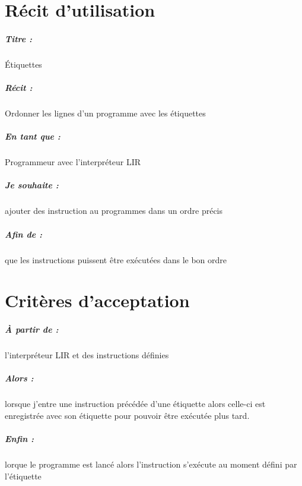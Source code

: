 \documentclass[12pt,a5paper, notitle, oneside]{report}
\begin{document}
    \chapter*{Récit d'utilisation}

    \paragraph{Titre : } Étiquettes
    \paragraph{Récit : } Ordonner les lignes d'un programme avec les étiquettes
    \paragraph{En tant que : } Programmeur avec l'interpréteur LIR
    \paragraph{Je souhaite : } ajouter des instruction au programmes dans un ordre précis
    \paragraph{Afin de : } que les instructions puissent être exécutées dans le bon ordre
    \newpage

    \chapter*{Critères d'acceptation}

    \paragraph{À partir de : } l'interpréteur LIR et des instructions définies
    \paragraph{Alors : } lorsque j'entre une instruction précédée d'une étiquette alors celle-ci est enregistrée avec son étiquette pour pouvoir être exécutée plus tard.
    \paragraph{Enfin : } lorque le programme est lancé alors l'instruction s'exécute au moment défini par l'étiquette
\end{document}
